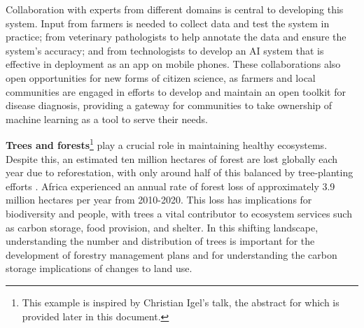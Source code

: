 Collaboration with experts from different domains is central to
developing this system. Input from farmers is needed to collect data and
test the system in practice; from veterinary pathologists to help
annotate the data and ensure the system's accuracy; and from
technologists to develop an AI system that is effective in deployment as
an app on mobile phones. These collaborations also open opportunities
for new forms of citizen science, as farmers and local communities are
engaged in efforts to develop and maintain an open toolkit for disease
diagnosis, providing a gateway for communities to take ownership of
machine learning as a tool to serve their needs.

\noindent\textbf{Trees and forests}\footnote{This example is inspired by
  Christian Igel's talk, the abstract for which is provided later in
  this document.} play a crucial role in maintaining healthy ecosystems.
Despite this, an estimated ten million hectares of forest are lost
globally each year due to reforestation, with only around half of this
balanced by tree-planting efforts \cite{Ritchie-forests21}. Africa
experienced an annual rate of forest loss of approximately 3.9 million
hectares per year from 2010-2020. This loss has implications for
biodiversity and people, with trees a vital contributor to ecosystem
services such as carbon storage, food provision, and shelter. In this
shifting landscape, understanding the number and distribution of trees
is important for the development of forestry management plans and for
understanding the carbon storage implications of changes to land use.

